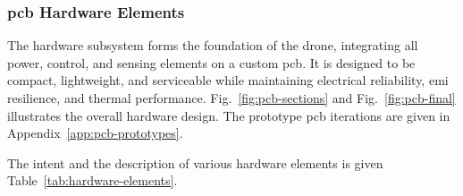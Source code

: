 \subsubsection{\gls{pcb} Hardware Elements}

The hardware subsystem forms the foundation of the drone, integrating all power, control, and sensing elements on a custom \gls{pcb}. It is designed to be compact, lightweight, and serviceable while maintaining electrical reliability, \gls{emi} resilience, and thermal performance. Fig.~\ref{fig:pcb-sections} and Fig.~\ref{fig:pcb-final} illustrates the overall hardware design. The prototype \gls{pcb} iterations are given in Appendix~\ref{app:pcb-prototypes}. 

The intent and the description of various hardware elements is given Table~\ref{tab:hardware-elements}.

